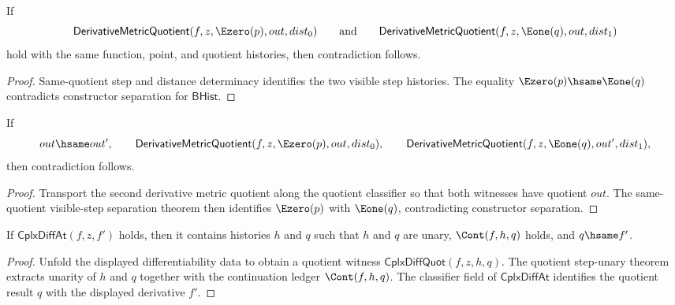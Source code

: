 \begin{theorem}
\label{thm:derivative-metric-quotient-visible-step-same-quotient-absurd}
If
$$
\mathsf{DerivativeMetricQuotient}(f,z,\Ezero(p),out,dist_0)
\qquad\text{and}\qquad
\mathsf{DerivativeMetricQuotient}(f,z,\Eone(q),out,dist_1)
$$
hold with the same function, point, and quotient histories, then contradiction
follows.
\end{theorem}
\begin{proof}
Same-quotient step and distance determinacy identifies the two visible step
histories. The equality $\Ezero(p)\hsame\Eone(q)$ contradicts constructor
separation for $\mathsf{BHist}$.
\end{proof}

\begin{theorem}
\label{thm:derivative-metric-quotient-visible-step-hsame-quotient-absurd}
If
$$
out\hsame out',
\qquad
\mathsf{DerivativeMetricQuotient}(f,z,\Ezero(p),out,dist_0),
\qquad
\mathsf{DerivativeMetricQuotient}(f,z,\Eone(q),out',dist_1),
$$
then contradiction follows.
\end{theorem}
\begin{proof}
Transport the second derivative metric quotient along the quotient classifier
so that both witnesses have quotient $out$. The same-quotient visible-step
separation theorem then identifies $\Ezero(p)$ with $\Eone(q)$, contradicting
constructor separation.
\end{proof}

\begin{theorem}
\label{thm:derivative-cplx-diff-at-witness-step-unary}
If \(\mathsf{CplxDiffAt}(f,z,f')\) holds, then it contains histories \(h\) and
\(q\) such that \(h\) and \(q\) are unary, \(\Cont(f,h,q)\) holds, and
\(q\hsame f'\).
\end{theorem}
\begin{proof}
Unfold the displayed differentiability data to obtain a quotient witness
\(\mathsf{CplxDiffQuot}(f,z,h,q)\). The quotient step-unary theorem extracts
unarity of \(h\) and \(q\) together with the continuation ledger
\(\Cont(f,h,q)\). The classifier field of \(\mathsf{CplxDiffAt}\) identifies
the quotient result \(q\) with the displayed derivative \(f'\).
\end{proof}

